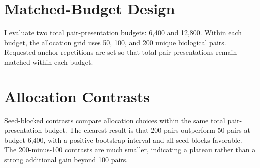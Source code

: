 \documentclass[10pt]{article}
\begin{document}
\section{Matched-Budget Design}

I evaluate two total pair-presentation budgets: 6,400 and 12,800. Within each budget, the allocation grid uses 50, 100, and 200 unique biological pairs. Requested anchor repetitions are set so that total pair presentations remain matched within each budget.

\begin{center}
\begin{minipage}{0.98\linewidth}
\centering
{}
\label{tab:allocation-means}
\footnotesize
{}
\end{minipage}
\end{center}

\section{Allocation Contrasts}

Seed-blocked contrasts compare allocation choices within the same total pair-presentation budget. The clearest result is that 200 pairs outperform 50 pairs at budget 6,400, with a positive bootstrap interval and all seed blocks favorable. The 200-minus-100 contrasts are much smaller, indicating a plateau rather than a strong additional gain beyond 100 pairs.
\end{document}
